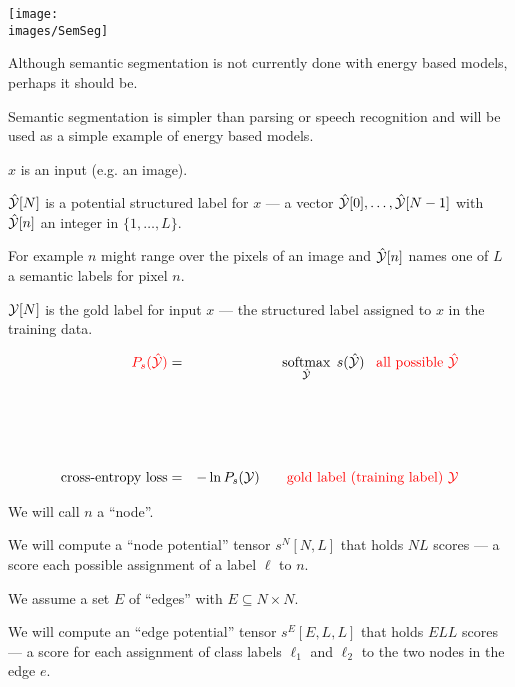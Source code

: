 {

\centerline{\texttt{[image: \\images/SemSeg]}}

\vfill
Although semantic segmentation is not currently done with energy based models, perhaps it should be.

\vfill
Semantic segmentation is simpler than parsing or speech recognition and will be used as a simple example of energy based models.


$x$ is an input (e.g. an image).

\vfill
$\hat{\cal Y} [N]$ is a potential structured label for $x$ --- a vector $\hat{\cal Y}[0],\ldots,\hat{\cal Y}[N-1]$ with $\hat{\cal Y}[n]$ an integer in $\{1,\ldots,L\}$.

\vfill
For example $n$ might range over the pixels of an image and $\hat{\cal Y}[n]$ names one of $L$ a semantic labels for pixel $n$.

\vfill
${\cal Y}[N]$ is the gold label for input $x$ --- the structured label assigned to $x$ in the training data.


{\huge
\begin{eqnarray*}
{\color{red} P_s(\hat{{\cal Y}})} & = & \operatorname*{softmax}_{\hat{{\cal Y}}}\;s(\hat{{\cal Y}}) \;\;\;\mbox{\color{red} all possible $\hat{{\cal Y}}$} \\
\\
\\
\\
\\
\mbox{cross-entropy loss} & = & - \ln P_s({\cal Y}) \;\;\;{\color{red} \;\;\;\;\mbox{gold label (training label) ${\cal Y}$}}
\end{eqnarray*}
}



We will call $n$ a ``node''.

\vfill
We will compute a ``node potential'' tensor {\color{red} $s^N[N,L]$} that holds $NL$ scores --- a score each possible assignment of a label $\ell$ to $n$.

\vfill
We assume a set $E$ of ``edges'' with $E \subseteq N \times N$.

\vfill
We will compute an ``edge potential'' tensor {\color{red} $s^E[E,L,L]$} that holds $ELL$ scores --- a score for each assignment of class labels $\ell_1$ and $\ell_2$
to the two nodes in the edge $e$.


}
